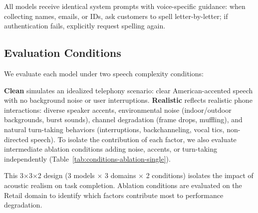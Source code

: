 \begin{table}[h]
\caption{Audio-native models evaluated; the Alias column shows the short form used in results tables.}
\label{tab:models}
\centering
\begin{small}
\end{small}
\end{table}

All models receive identical system prompts with voice-specific guidance: when collecting names, emails, or IDs, ask customers to spell letter-by-letter; if authentication fails, explicitly request spelling again.

\subsection{Evaluation Conditions}

We evaluate each model under two speech complexity conditions:



\textbf{Clean} simulates an idealized telephony scenario: clear American-accented speech with no background noise or user interruptions. \textbf{Realistic} reflects realistic phone interactions: diverse speaker accents, environmental noise (indoor/outdoor backgrounds, burst sounds), channel degradation (frame drops, muffling), and natural turn-taking behaviors (interruptions, backchanneling, vocal tics, non-directed speech). To isolate the contribution of each factor, we also evaluate intermediate ablation conditions adding noise, accents, or turn-taking independently (Table~\ref{tab:conditions-ablation-single}).



This 3$\times$3$\times$2 design (3 models $\times$ 3 domains $\times$ 2 conditions) isolates the impact of acoustic realism on task completion. Ablation conditions are evaluated on the Retail domain to identify which factors contribute most to performance degradation.

